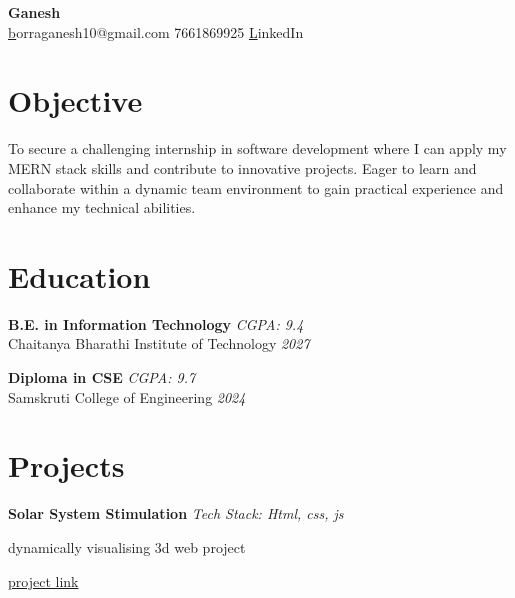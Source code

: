 \documentclass[a4paper,10pt]{article}
\begin{document}
\begin{center}
    {\huge \textbf{ Ganesh }} \\
    \vspace{5pt}
    \small \href{mailto:borraganesh10@gmail.com } borraganesh10@gmail.com \quad \textbullet{} 7661869925     
    \quad \textbullet{} \href{ https://www.linkedin.com/in/ganesh10-/ }LinkedIn 
  
\end{center}

    
\section*{Objective}
\noindent
To secure a challenging internship in software development where I can apply my MERN stack skills and contribute to innovative projects.  Eager to learn and collaborate within a dynamic team environment to gain practical experience and enhance my technical abilities.
\vspace{0.3cm}


\section*{Education}

\noindent
\textbf{ B.E. in Information Technology } \hfill  \textit{ CGPA: 9.4 } \\
Chaitanya Bharathi Institute of Technology  \hfill  \textit{ 2027 } 
\vspace{0.3cm}

\noindent
\textbf{ Diploma in CSE } \hfill  \textit{ CGPA: 9.7 } \\
Samskruti College of Engineering  \hfill  \textit{ 2024 } 
\vspace{0.3cm}



\section*{Projects}
\noindent
\begin{compactitem}
    
        \item\textbf{ Solar System Stimulation } \hfill \textit{ Tech Stack: Html, css, js } 
        \begin{compactitem}
            
            \item dynamically visualising 3d web project
            
        \end{compactitem}
        \href{ www.google.com }{project link}
    
\end{compactitem}
\end{document}
